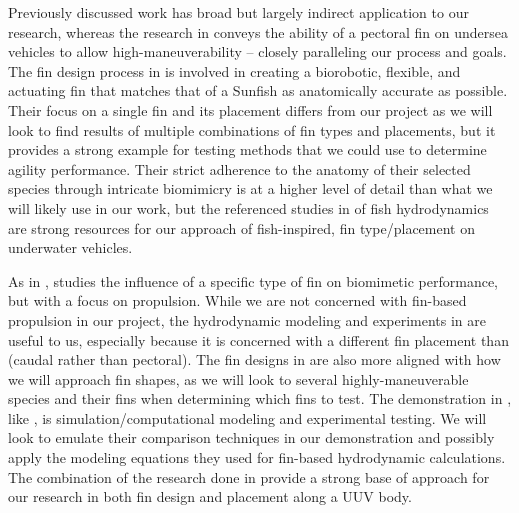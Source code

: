 \documentclass{IEEEtran}
\begin{document}
Previously discussed work has broad but largely indirect application to our research, whereas the research in \cite{berenice2018splash} conveys the ability of a pectoral fin on undersea vehicles to allow high-maneuverability -- closely paralleling our process and goals. The fin design process in \cite{berenice2018splash} is involved in creating a biorobotic, flexible, and actuating fin that matches that of a Sunfish as anatomically accurate as possible. Their focus on a single fin and its placement differs from our project as we will look to find results of multiple combinations of fin types and placements, but it provides a strong example for testing methods that we could use to determine agility performance. Their strict adherence to the anatomy of their selected species through intricate biomimicry is at a higher level of detail than what we will likely use in our work, but the referenced studies in \cite{berenice2018splash} of fish hydrodynamics are strong resources for our approach of fish-inspired, fin type/placement on underwater vehicles.

As in \cite{berenice2018splash}, \cite{orourke2020navy} studies the influence of a specific type of fin on biomimetic performance, but with a focus on propulsion. While we are not concerned with fin-based propulsion in our project, the hydrodynamic modeling and experiments in \cite{orourke2020navy} are useful to us, especially because it is concerned with a different fin placement than \cite{berenice2018splash} (caudal rather than pectoral). The fin designs in \cite{orourke2020navy} are also more aligned with how we will approach fin shapes, as we will look to several highly-maneuverable species and their fins when determining which fins to test. The demonstration in \cite{orourke2020navy}, like \cite{noaa2009how}, is simulation/computational modeling and experimental testing. We will look to emulate their comparison techniques in our demonstration and possibly apply the modeling equations they used for fin-based hydrodynamic calculations. The combination of the research done in \cite{berenice2018splash, orourke2020navy} provide a strong base of approach for our research in both fin design and placement along a UUV body.
\end{document}
